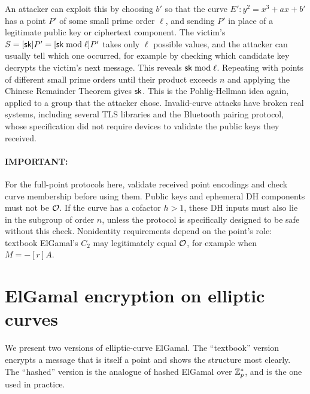 An attacker can exploit this by choosing $b'$ so that the curve
$E' \colon y^2 = x^3 + ax + b'$ has a point $P'$ of some small prime order
$\ell$, and sending $P'$ in place of a legitimate public key or
ciphertext component.
The victim's $S = [{\mathsf{sk}}]P' = [{\mathsf{sk}} \bmod \ell]P'$ takes only $\ell$
possible values, and the attacker can usually tell which one occurred,
for example by checking which candidate key decrypts the victim's next
message. This reveals ${\mathsf{sk}} \bmod \ell$.
Repeating with points of different small prime orders until their product
exceeds $n$ and applying the Chinese Remainder Theorem gives ${\mathsf{sk}}$.
This is the Pohlig-Hellman idea again, applied to a group that the
attacker chose.
Invalid-curve attacks have broken real systems, including several TLS
libraries\autocite{JSS15} and the Bluetooth pairing protocol, whose
specification did not require devices to validate the public keys they
received.\autocite{BihamNeumann19}

\paragraph{\textbf{IMPORTANT}:}
For the full-point protocols here, validate received point encodings and
check curve membership before using them. Public keys and ephemeral DH
components must not be $\mathcal{O}$. If the curve has a cofactor $h > 1$,
these DH inputs must also lie in the subgroup of order $n$, unless the
protocol is specifically designed to be safe without this check.
Nonidentity requirements depend on the point's role: textbook ElGamal's
$C_2$ may legitimately equal $\mathcal{O}$, for example when $M = -[r]A$.

\section{ElGamal encryption on elliptic curves}

We present two versions of elliptic-curve ElGamal. The ``textbook''
version encrypts a message that is itself a point and shows the structure
most clearly. The ``hashed'' version is the analogue of hashed ElGamal
over $\mathbb{Z}^*_p$, and is the one used in practice.

